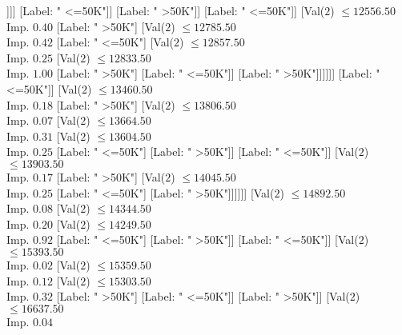 \documentclass[margin=10pt]{standalone}
\begin{document}
\begin{forest}
																									[Label: " <=50K"]
																									[Label: " >50K"]]]]
																						[Label: " <=50K"]]
																					[Label: " >50K"]]
																				[Label: " <=50K"]]
																			[Val($2$) $ \leq 12556.50$ \\ Imp. $0.40$
																				[Label: " >50K"]
																				[Val($2$) $ \leq 12785.50$ \\ Imp. $0.42$
																					[Label: " <=50K"]
																					[Val($2$) $ \leq 12857.50$ \\ Imp. $0.25$
																						[Val($2$) $ \leq 12833.50$ \\ Imp. $1.00$
																							[Label: " >50K"]
																							[Label: " <=50K"]]
																						[Label: " >50K"]]]]]]
																	[Label: " <=50K"]]
																[Val($2$) $ \leq 13460.50$ \\ Imp. $0.18$
																	[Label: " >50K"]
																	[Val($2$) $ \leq 13806.50$ \\ Imp. $0.07$
																		[Val($2$) $ \leq 13664.50$ \\ Imp. $0.31$
																			[Val($2$) $ \leq 13604.50$ \\ Imp. $0.25$
																				[Label: " <=50K"]
																				[Label: " >50K"]]
																			[Label: " <=50K"]]
																		[Val($2$) $ \leq 13903.50$ \\ Imp. $0.17$
																			[Label: " >50K"]
																			[Val($2$) $ \leq 14045.50$ \\ Imp. $0.25$
																				[Label: " <=50K"]
																				[Label: " >50K"]]]]]]
															[Val($2$) $ \leq 14892.50$ \\ Imp. $0.08$
																[Val($2$) $ \leq 14344.50$ \\ Imp. $0.20$
																	[Val($2$) $ \leq 14249.50$ \\ Imp. $0.92$
																		[Label: " <=50K"]
																		[Label: " >50K"]]
																	[Label: " <=50K"]]
																[Val($2$) $ \leq 15393.50$ \\ Imp. $0.02$
																	[Val($2$) $ \leq 15359.50$ \\ Imp. $0.12$
																		[Val($2$) $ \leq 15303.50$ \\ Imp. $0.32$
																			[Label: " >50K"]
																			[Label: " <=50K"]]
																		[Label: " >50K"]]
																	[Val($2$) $ \leq 16637.50$ \\ Imp. $0.04$

\end{forest}
\end{document}
